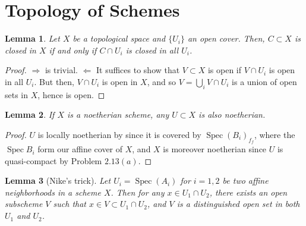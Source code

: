 \documentclass[12pt,letterpaper]{article}
\newtheorem{lemma}{Lemma}[section]
\theoremstyle{definition}
\theoremstyle{remark}
\numberwithin{equation}{section}
\numberwithin{figure}{problem}
\DeclareMathOperator{\Spec}{Spec}
\begin{document}
\section{Topology of Schemes}
\begin{lemma}\label{closedlocalcond}
  Let $X$ be a topological space and $\{U_i\}$ an open cover. Then, $C \subset X$ is closed in $X$ if and only if $C \cap U_i$ is closed in all $U_i$.
\end{lemma}
\begin{proof}
  $\Rightarrow$ is trivial. $\Leftarrow$ It suffices to show that $V \subset X$ is open if $V \cap U_i$ is open in all $U_i$. But then, $V \cap U_i$ is open in $X$, and so $V = \bigcup_i V \cap U_i$ is a union of open sets in $X$, hence is open.
\end{proof}
\begin{lemma}\label{noethinherit}
  If $X$ is a noetherian scheme, any $U \subset X$ is also noetherian.
\end{lemma}
\begin{proof}
  $U$ is locally noetherian by \cite[Prop.~7.3]{AM69} since it is covered by $\Spec (B_i)_{f_f}$, where the $\Spec B_i$ form our affine cover of $X$, and $X$ is moreover noetherian since $U$ is quasi-compact by Problem $2.13(a)$.
\end{proof}
\begin{lemma}[Nike's trick]\label{niketrick}
  Let $U_i = \Spec(A_i)$ for $i=1,2$ be two affine neighborhoods in a scheme $X$. Then for any $x \in U_1 \cap U_2$, there exists an open subscheme $V$ such that $x \in V \subset U_1 \cap U_2$, and $V$ is a distinguished open set in both $U_1$ and $U_2$.
\end{lemma}
\end{document}
